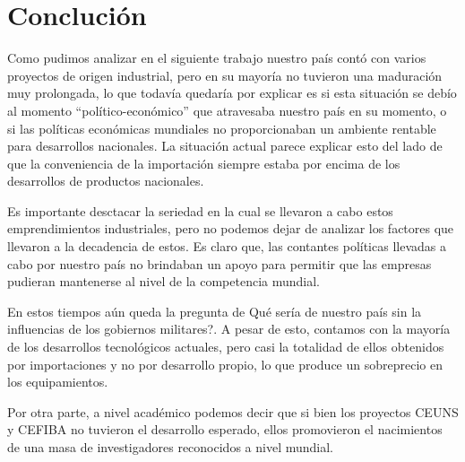 \documentclass[%
 	final,
%
	notitlepage,
	narroweqnarray,
	inline,
 	twoside,
	]{ieee}
\begin{document}



\section{Concluci\'on}
Como pudimos analizar en el siguiente trabajo nuestro pa\'is cont\'o con varios proyectos de origen industrial, pero en su mayor\'ia no tuvieron una maduraci\'on muy prolongada, lo que todav\'ia quedar\'ia por explicar es si esta situaci\'on se deb\'io al momento ``pol\'itico-econ\'omico'' que atravesaba nuestro pa\'is en su momento, o si las pol\'iticas econ\'omicas mundiales no proporcionaban un ambiente rentable para desarrollos nacionales. La situaci\'on actual parece explicar esto del lado de que la conveniencia de la importaci\'on siempre estaba por encima de los desarrollos de productos nacionales.

Es importante desctacar la seriedad en la cual se llevaron a cabo estos emprendimientos industriales, pero no podemos dejar de analizar los factores que llevaron a la decadencia de estos. Es claro que, las contantes pol\'iticas llevadas a cabo por nuestro pa\'is no brindaban un apoyo para permitir que las empresas pudieran mantenerse al nivel de la competencia mundial.

En estos tiempos a\'un queda la pregunta de \textquestiondown Qu\'e ser\'ia de nuestro pa\'is sin la influencias de los gobiernos militares?.
A pesar de esto, contamos con la mayor\'ia de los desarrollos tecnol\'ogicos actuales, pero casi la totalidad de ellos obtenidos por importaciones y no por desarrollo propio, lo que produce un sobreprecio en los equipamientos.

Por otra parte, a nivel acad\'emico podemos decir que si bien los proyectos CEUNS y CEFIBA no tuvieron el desarrollo esperado, ellos promovieron el nacimientos de una masa de investigadores reconocidos a nivel mundial.
\end{document}
